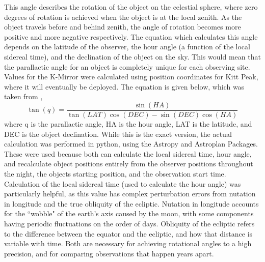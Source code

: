 \documentclass[manuscript]{aastex}
\begin{document}
This angle describes the rotation of the object on the celestial sphere, where zero degrees of rotation is achieved when the object is at the local zenith. As the object travels before and behind zenith, the angle of rotation becomes more positive and more negative respectively. The equation which calculates this angle depends on the latitude of the observer, the hour angle (a function of the local sidereal time), and the declination of the object on the sky. This would mean that the parallactic angle for an object is completely unique for each observing site. Values for the K-Mirror were calculated using position coordinates for Kitt Peak, where it will eventually be deployed. The equation is given below, which was taken from \cite{Meeus1998},
\begin{equation}
\tan(q) = \frac{\sin{(HA)}}{\tan(LAT)\cos{(DEC)} - \sin{(DEC)}\cos{(HA)}}
\end{equation}
where q is the parallactic angle, HA is the hour angle, LAT is the latitude, and DEC is the object declination. While this is the exact version, the actual calculation was performed in python, using the {\sc Astropy} and {\sc Astroplan} Packages. These were used because both can calculate the local sidereal time, hour angle, and recalculate object positions entirely from the observer positions throughout the night, the objects starting position, and the observation start time. Calculation of the local sidereal time (used to calculate the hour angle) was particularly helpful, as this value has complex perturbation errors from nutation in longitude and the true obliquity of the ecliptic. Nutation in longitude accounts for the ``wobble" of the earth's axis caused by the moon, with some components having periodic fluctuations on the order of days. Obliquity of the ecliptic refers to the difference between the equator and the ecliptic, and how that distance is variable with time. Both are necessary for achieving rotational angles to a high precision, and for comparing observations that happen years apart. 
\end{document}
